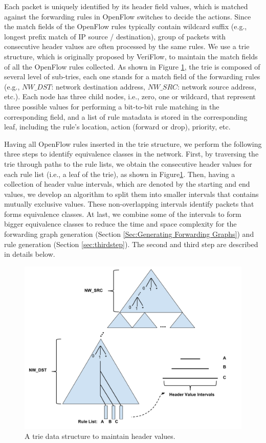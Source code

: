 Each packet is uniquely identified by its header field values, which is matched against the forwarding rules in OpenFlow switches to decide the actions. Since the match fields of the OpenFlow rules typically contain wildcard suffix (e.g., longest prefix match of IP source / destination), group of packets with consecutive header values are often processed by the same rules. We use a trie structure, which is originally proposed by VeriFlow\cite{Veriflow}, to maintain the match fields of all the OpenFlow rules collected. As shown in Figure \ref{Fig:Trie}, the trie is composed of several level of sub-tries, each one stands for a match field of the forwarding rules (e.g., $NW\_DST$: network destination address, $NW\_SRC$: network source address, etc.). Each node has three child nodes, i.e., zero, one or wildcard, that represent three possible values for performing a bit-to-bit rule matching in the corresponding field, and a list of rule matadata is stored in the corresponding leaf, including the rule's location, action (forward or drop), priority, etc. 

Having all OpenFlow rules inserted in the trie structure, we perform the following three steps to identify equivalence classes in the network. First, by traversing the trie through paths to the rule lists, we obtain the consecutive header values for each rule list (i.e., a leaf of the trie), as shown in Figure\ref{Fig:Trie}. Then, having a collection of header value intervals, which are denoted by the starting and end values, we develop an algorithm to split them into smaller intervals that contains mutually exclusive values. These non-overlapping intervals identify packets that forms equivalence classes. At last, we combine some of the intervals to form bigger equivalence classes to reduce the time and space complexity for the forwarding graph generation (Section \ref{Sec:Generating Forwarding Graphs}) and rule generation (Section \ref{sec:thirdstep}). The second and third step are described in details below.

\begin{figure}[t]
\centering
\includegraphics[scale=.35]{figures/trie.pdf}
\caption{A trie data structure to maintain header values.}
\label{Fig:Trie}
\end{figure}

